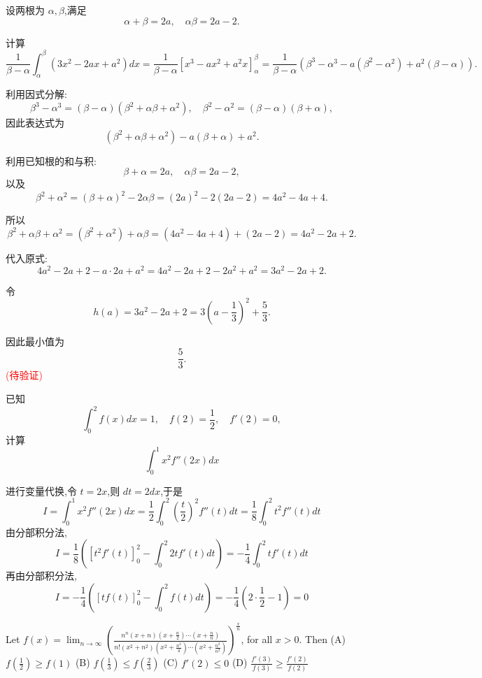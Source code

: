\begin{questions}
\begin{solution}
设两根为 $\alpha, \beta$,满足
\[
\alpha + \beta = 2 a, \quad \alpha \beta = 2 a - 2.
\]

计算
\[
\frac{1}{\beta - \alpha} \int_\alpha^\beta (3 x^2 - 2 a x + a^2) dx = \frac{1}{\beta - \alpha} \left[ x^3 - a x^2 + a^2 x \right]_\alpha^\beta = \frac{1}{\beta - \alpha} \left( \beta^3 - \alpha^3 - a (\beta^2 - \alpha^2) + a^2 (\beta - \alpha) \right).
\]

利用因式分解:
\[
\beta^3 - \alpha^3 = (\beta - \alpha)(\beta^2 + \alpha \beta + \alpha^2), \quad \beta^2 - \alpha^2 = (\beta - \alpha)(\beta + \alpha),
\]
因此表达式为
\[
(\beta^2 + \alpha \beta + \alpha^2) - a (\beta + \alpha) + a^2.
\]

利用已知根的和与积:
\[
\beta + \alpha = 2 a, \quad \alpha \beta = 2 a - 2,
\]
以及
\[
\beta^2 + \alpha^2 = (\beta + \alpha)^2 - 2 \alpha \beta = (2 a)^2 - 2 (2 a - 2) = 4 a^2 - 4 a + 4.
\]

所以
\[
\beta^2 + \alpha \beta + \alpha^2 = (\beta^2 + \alpha^2) + \alpha \beta = (4 a^2 - 4 a + 4) + (2 a - 2) = 4 a^2 - 2 a + 2.
\]

代入原式:
\[
4 a^2 - 2 a + 2 - a \cdot 2 a + a^2 = 4 a^2 - 2 a + 2 - 2 a^2 + a^2 = 3 a^2 - 2 a + 2.
\]

令
\[
h(a) = 3 a^2 - 2 a + 2 = 3 \left(a - \frac{1}{3}\right)^2 + \frac{5}{3}.
\]

因此最小值为
\[
\frac{5}{3}.
\]
\textcolor{red}{(待验证)}
\end{solution}

    \question 已知 
    \[
    \int_0^2 f(x) dx = 1,\quad f(2) = \frac{1}{2},\quad f'(2) = 0,
    \]
    计算 
    \[
    \int_0^1 x^2 f''(2x) dx
    \]
    \begin{solution}
        进行变量代换,令 $t = 2x$,则 $dt = 2dx$,于是
        \[ 
        I = \int_0^1 x^2 f''(2x) dx = \frac{1}{2} \int_0^2 (\frac{t}{2})^2 f''(t) dt = \frac{1}{8} \int_0^2 t^2 f''(t) dt
        \]
        由分部积分法,
        \[ 
        I = \frac{1}{8} \left([t^2 f'(t)]_0^2 - \int_0^2 2t f'(t) dt\right)= -\frac{1}{4} \int_0^2 t f'(t) dt 
        \]
        再由分部积分法,
        \[ 
        I = -\frac{1}{4} ([t f(t)]_0^2 - \int_0^2 f(t) dt) = -\frac{1}{4} (2 \cdot \frac{1}{2} - 1) =0
        \]
    \end{solution}

    \question
Let $f(x) = \lim_{n \to \infty} \left( \frac{n^n (x+n)(x+\frac{n}{2}) \cdots (x+\frac{n}{n})}{n! (x^2+n^2)(x^2+\frac{n^2}{4}) \cdots (x^2+\frac{n^2}{n^2})} \right)^{\frac{x}{n}}$, for all $x > 0$. Then
(A) $f(\frac{1}{2}) \geq f(1)$ \quad (B) $f(\frac{1}{3}) \leq f(\frac{2}{3})$ \quad (C) $f'(2) \leq 0$ \quad (D) $\frac{f'(3)}{f(3)} \geq \frac{f'(2)}{f(2)}$


\end{questions}
